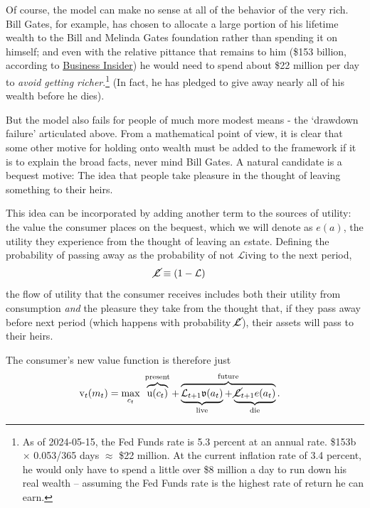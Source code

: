 \documentclass{article}
\newcommand{\uFunc}{\mathrm{u}}
\newcommand{\vFunc}{\mathrm{v}}
\newcommand{\Alive}{\mathcal{L}}
\newcommand{\cNrm}{c}
\newcommand{\aNrm}{a}
\newcommand{\mNrm}{m}
\newcommand{\bqstNrm}{e}
\begin{document}
Of course, the model can make no sense at all of the behavior of the very rich.
Bill Gates, for example, has chosen to allocate a large portion of his lifetime wealth to the Bill and Melinda Gates foundation rather than spending it on himself; and even with the relative pittance that remains to him (\$153 billion, according to \href{https://www.businessinsider.com/how-bill-gates-spends-fortune}{Business Insider}) he would need to spend about \$22 million per day to \textit{avoid getting richer}.\footnote{As of 2024-05-15, the Fed Funds rate is 5.3 percent at an annual rate.
\$153b $\times$ 0.053/365 days $\approx$ \$22 million.
At the current inflation rate of 3.4 percent, he would only have to spend a little over \$8 million a day to run down his real wealth -- assuming the Fed Funds rate is the highest rate of return he can earn.}
(In fact, he has pledged to give away nearly all of his wealth before he dies).

But the model also fails for people of much more modest means - the `drawdown failure' articulated above.
From a mathematical point of view, it is clear that some other motive for holding onto wealth must be added to the framework if it is to explain the broad facts, never mind Bill Gates.
A natural candidate is a bequest motive: The idea that people take pleasure in the thought of leaving something to their heirs.

This idea can be incorporated by adding another term to the sources of utility: the value the consumer places on the bequest, which we will denote as $\bqstNrm(\aNrm)$, the utility they experience from the thought of leaving an $\bqstNrm$state.
Defining the probability of passing away as the probability of not $\Alive$iving to the next period,
\begin{align}
    \cancel{\Alive} & \equiv (1-\Alive)
\end{align}
the flow of utility that the consumer receives includes both their utility from consumption \textit{and} the pleasure they take from the thought that, if they pass away before next period (which happens with probability $\cancel{\Alive}$), their assets will pass to their heirs.

The consumer's new value function is therefore just
\begin{align}
    {\vFunc}_{t}({\mNrm}_{t}) & = \max_{\cNrm_{t}} ~ \overbrace{\uFunc(\cNrm_{t})}^{\text{present}}+\overbrace{\underbrace{\Alive_{t+1}\mathfrak{v}(\aNrm_{t})}_{\text{live}} + \underbrace{\cancel{\Alive}_{t+1}\bqstNrm({\aNrm}_{t})}_{\text{die}}
    }^{\text{future}}.
\end{align}
\end{document}
